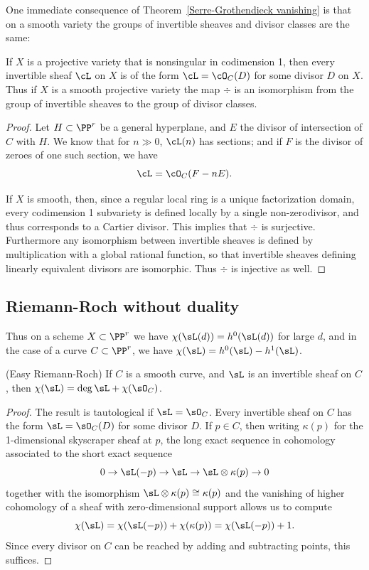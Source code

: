 One immediate consequence of Theorem~\ref{Serre-Grothendieck vanishing} is that on a smooth variety the groups of invertible sheaves and divisor classes are the same:

\begin{corollary}\label{invertible sheaves and divisors}
If $X$ is a projective variety that is nonsingular in codimension 1, then every invertible sheaf $\cL$ on $X$ is of the form $\cL = \cO_C(D)$ for some divisor $D$ on $X$. Thus if $X$ is a smooth projective variety the map $\div$ is an isomorphism from the group of invertible sheaves to the group
of divisor classes.
\end{corollary}

\begin{proof}
Let $H \subset \PP^r$ be a general hyperplane, and $E$  the divisor  of intersection of $C$ with $H$. We know that for $n \gg 0$, $\cL(n)$ has sections; and if $F$ is the divisor of zeroes of one such section, we have
$$
\cL = \cO_C(F - nE).
$$

If $X$ is smooth, then, since a regular local ring is a unique factorization domain, every codimension 1 subvariety is defined locally
by a single non-zerodivisor, and thus corresponds to a Cartier divisor. This implies that $\div$ is surjective. Furthermore any isomorphism between invertible sheaves 
is defined by multiplication with a global rational function, so that invertible sheaves defining linearly equivalent divisors are
isomorphic. Thus $\div$ is injective as well.
\end{proof}

\subsection{Riemann-Roch without duality}

Thus on a scheme $X\subset \PP^r$ we have $\chi(\sL(d)) = h^0(\sL(d))$ for large $d$, and in the case of a curve $C\subset \PP^r$, we have $\chi(\sL) = h^0(\sL) - h^1(\sL)$. 

\begin{theorem} (Easy Riemann-Roch)\label{easy RR}
If $C$ is a smooth curve, and $\sL$ is an invertible sheaf on $C$, then $\chi(\sL) = \deg \sL + \chi(\sO_C)$.
\end{theorem}

\begin{proof}
 The result is tautological if $\sL = \sO_C$. Every invertible sheaf on $C$ has the form $\sL = \sO_C(D)$ for some
divisor $D$. If $p\in C$, then writing $\kappa(p)$ for the 1-dimensional skyscraper sheaf at $p$, the long exact sequence in cohomology
associated to the short exact sequence
$$
0\to \sL(-p) \to \sL \to \sL\otimes \kappa(p)\to 0
$$
together with the isomorphism $\sL\otimes \kappa(p) \cong \kappa(p)$
and the vanishing of higher cohomology of a sheaf with zero-dimensional support allows us to compute 
$$
\chi(\sL) = \chi(\sL(-p)) + \chi(\kappa(p)) = \chi(\sL(-p)) + 1.
$$
Since every divisor on $C$ can be reached by adding and subtracting points, this suffices.
\end{proof}

